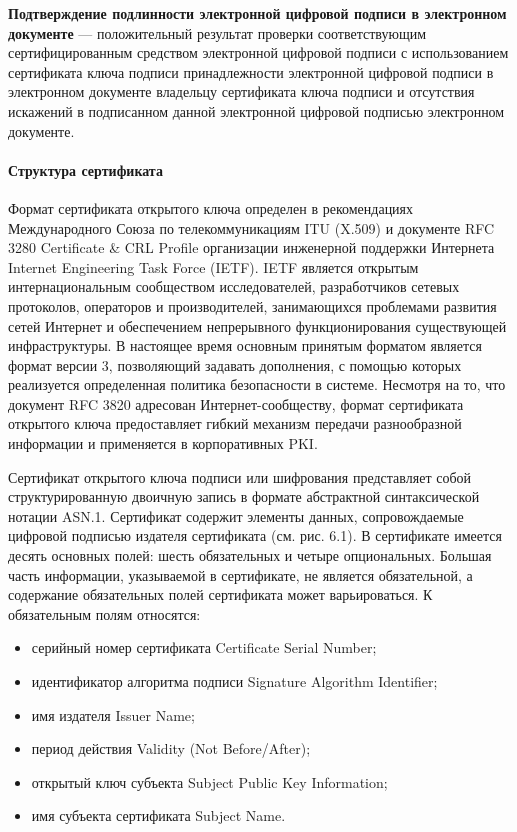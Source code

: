 \textbf{Подтверждение подлинности электронной цифровой подписи в электронном
документе} --- положительный результат проверки соответствующим
сертифицированным средством электронной цифровой подписи с использованием
сертификата ключа подписи принадлежности электронной цифровой подписи в
электронном документе владельцу сертификата ключа подписи и отсутствия
искажений в подписанном данной электронной цифровой подписью электронном
документе.

\paragraph{Структура сертификата}
Формат сертификата открытого ключа определен в рекомендациях Международного
Союза по телекоммуникациям ITU (X.509) и документе RFC 3280 Certificate \&
CRL Profile организации инженерной поддержки Интернета Internet Engineering
Task Force (IETF). IETF является открытым интернациональным сообществом
исследователей, разработчиков сетевых протоколов, операторов и
производителей, занимающихся проблемами развития сетей Интернет и
обеспечением непрерывного функционирования существующей инфраструктуры. В
настоящее время основным принятым форматом является формат версии 3,
позволяющий задавать дополнения, с помощью которых реализуется определенная
политика безопасности в системе. Несмотря на то, что документ RFC 3820
адресован Интернет-сообществу, формат сертификата открытого ключа
предоставляет гибкий механизм передачи разнообразной информации и применяется
в корпоративных PKI.

Сертификат открытого ключа подписи или шифрования представляет собой
структурированную двоичную запись в формате абстрактной синтаксической
нотации ASN.1. Сертификат содержит элементы данных, сопровождаемые цифровой
подписью издателя сертификата (см. рис. 6.1). В сертификате имеется десять
основных полей: шесть обязательных и четыре опциональных. Большая часть
информации, указываемой в сертификате, не является обязательной, а содержание
обязательных полей сертификата может варьироваться. К обязательным полям
относятся:

\begin{itemize}
  \item серийный номер сертификата Certificate Serial Number;
  \item идентификатор алгоритма подписи Signature Algorithm Identifier;
  \item имя издателя Issuer Name;
  \item период действия Validity (Not Before/After);
  \item открытый ключ субъекта Subject Public Key Information;
  \item имя субъекта сертификата Subject Name.
\end{itemize}

